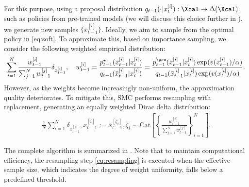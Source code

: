 For this purpose, using a proposal distribution $q_{t-1}(\cdot | x^{[i]}_{t}):\Xcal \to \Delta(\Xcal)$, such as policies from pre-trained models (we will discuss this choice further in ), we generate new samples $\{\bar x^{[i]}_{t-1}\}$. Ideally, we aim to sample from the optimal policy in \eqref{eq:soft}. To approximate this, based on importance sampling, we consider the following weighted empirical distribution:
\begin{align*}
     \sum_{i=1}^N \frac{w^{[i]}_{t-1}  }{\sum_{j=1}^N w^{[j]}_{t-1}}\delta_{ \bar x^{[i]}_{t-1}}, \quad w^{[i]}_{t-1} = \frac{p^{\star}_{t-1}(\bar x^{[i]}_{t-1}|x^{[i]}_{t} )  }{q_{t-1}( \bar x^{[i]}_{t-1}|x^{[i]}_{t} ) } = \frac{ p^{\pre}_{t-1}(\bar x^{[i]}_{t-1}|x^{[i]}_{t} )\exp(v(\bar x^{[i]}_{t-1})/\alpha) }{q_{t-1}(\bar x^{[i]}_{t-1}|x^{[i]}_{t} ) \exp(v(x^{[i]}_{t})/\alpha )   }. 
\end{align*}
However, as the weights become increasingly non-uniform, the approximation quality deteriorates. To mitigate this, SMC performs resampling with replacement, generating an equally weighted Dirac delta distribution: 
\begin{align}\label{eq:resampling}
    \frac{1}{N} \sum_{i=1}^N \delta_{x^{[i]}_{t-1}}, x^{[i]}_{t-1}:= \bar x^{[\zeta_i]}_{t-1}, \zeta_i \sim \mathrm{Cat}\left [\left\{   \frac{w^{[i]}_{t-1}  }{\sum_{j=1}^N w^{[j]}_{t-1}} \right\}_{i=1}^N \right ]. 
\end{align}

The complete algorithm is summarized in . Note that to maintain computational efficiency, the resampling step \eqref{eq:resampling} is executed when the effective sample size, which indicates the degree of weight uniformity, falls below a predefined threshold.


